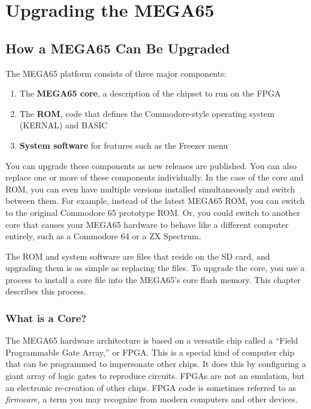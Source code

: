 \chapter{Upgrading the MEGA65}

\section{How a MEGA65 Can Be Upgraded}
\label{cha:cores}

The MEGA65 platform consists of three major components:

\begin{enumerate}
  \item The {\bf MEGA65 core}, a description of the chipset to run on the FPGA
  \item The {\bf ROM}, code that defines the Commodore-style operating system (KERNAL) and BASIC
  \item {\bf System software} for features such as the Freezer menu
\end{enumerate}

You can upgrade these components as new releases are published. You can also replace one or more of these components individually. In the case of the core and ROM, you can even have multiple versions installed simultaneously and switch between them. For example, instead of the latest MEGA65 ROM, you can switch to the original Commodore 65 prototype ROM. Or, you could switch to another core that causes your MEGA65 hardware to behave like a different computer entirely, such as a Commodore 64 or a ZX Spectrum.

The ROM and system software are files that reside on the SD card, and upgrading them is as simple as replacing the files. To upgrade the core, you use a process to install a core file into the MEGA65's core flash memory. This chapter describes this process.

\subsection{What is a Core?}

The MEGA65 hardware architecture is based on a versatile chip called a ``Field Programmable Gate Array,'' or FPGA. This is a special kind of computer chip that can be programmed to impersonate other chips. It does this by configuring a giant array of logic gates to reproduce circuits. FPGAs are not an emulation, but an electronic re-creation of other chips. FPGA code is sometimes referred to as {\em firmware,} a term you may recognize from modern computers and other devices.

